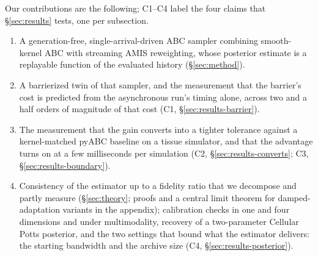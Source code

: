 \documentclass[pdflatex,sn-mathphys-num]{sn-jnl}
\theoremstyle{plain}
\theoremstyle{definition}
\begin{document}
Our contributions are the following; C1--C4 label the four claims that \S\ref{sec:results} tests, one per subsection.
\begin{enumerate}
\item A generation-free, single-arrival-driven ABC sampler combining smooth-kernel ABC with streaming AMIS reweighting, whose posterior estimate is a replayable function of the evaluated history (\S\ref{sec:method}).
\item A barrierized twin of that sampler, and the measurement that the barrier's cost is predicted from the asynchronous run's timing alone, across two and a half orders of magnitude of that cost (C1, \S\ref{sec:results-barrier}).
\item The measurement that the gain converts into a tighter tolerance against a kernel-matched pyABC baseline on a tissue simulator, and that the advantage turns on at a few milliseconds per simulation (C2, \S\ref{sec:results-converts}; C3, \S\ref{sec:results-boundary}).
\item Consistency of the estimator up to a fidelity ratio that we decompose and partly measure (\S\ref{sec:theory}; proofs and a central limit theorem for damped-adaptation variants in the appendix); calibration checks in one and four dimensions and under multimodality, recovery of a two-parameter Cellular Potts posterior, and the two settings that bound what the estimator delivers: the starting bandwidth and the archive size (C4, \S\ref{sec:results-posterior}).
\end{enumerate}
\end{document}
